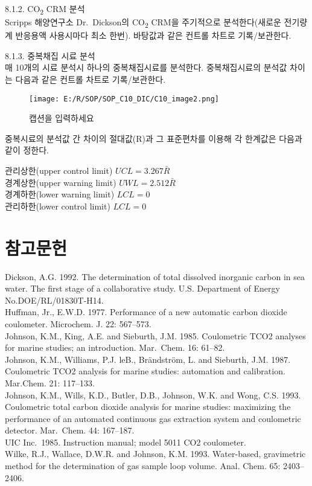 \documentclass[
]{book}
\begin{document}
8.1.2. CO\textsubscript{2} CRM 분석\\
Scripps 해양연구소 Dr.~Dickson의 CO\textsubscript{2} CRM을 주기적으로 분석한다(새로운 전기량계 반응용액 사용시마다 최소 한번). 바탕값과 같은 컨트롤 차트로 기록/보관한다.

8.1.3. 중복채집 시료 분석\\
매 10개의 시료 분석시 하나의 중복채집시료를 분석한다. 중복채집시료의 분석값 차이는 다음과 같은 컨트롤 차트로 기록/보관한다.

\begin{figure}
\centering
\texttt{[image: E:/R/SOP/SOP\_C10\_DIC/C10\_image2.png]}
\caption{캡션을 입력하세요}
\end{figure}

중복시료의 분석값 간 차이의 절대값(R)과 그 표준편차를 이용해 각 한계값은 다음과 같이 정한다.

관리상한(upper control limit) \(UCL=3.267\bar{R}\)\\
경계상한(upper warning limit) \(UWL=2.512\bar{R}\)\\
경계하한(lower warning limit) \(LCL=0\)\\
관리하한(lower control limit) \(LCL=0\)

\hypertarget{uxcc38uxace0uxbb38uxd5cc-7}{%
\section{참고문헌}\label{uxcc38uxace0uxbb38uxd5cc-7}}

Dickson, A.G. 1992. The determination of total dissolved inorganic carbon in sea water. The first stage of a collaborative study. U.S. Department of Energy No.DOE/RL/01830T-H14.\\
Huffman, Jr., E.W.D. 1977. Performance of a new automatic carbon dioxide coulometer. Microchem. J. 22: 567--573.\\
Johnson, K.M., King, A.E. and Sieburth, J.M. 1985. Coulometric TCO2 analyses for marine studies; an introduction. Mar.~Chem. 16: 61--82.\\
Johnson, K.M., Williams, P.J. leB., Brändström, L. and Sieburth, J.M. 1987. Coulometric TCO2 analysis for marine studies: automation and calibration. Mar.Chem. 21: 117--133.\\
Johnson, K.M., Wills, K.D., Butler, D.B., Johnson, W.K. and Wong, C.S. 1993. Coulometric total carbon dioxide analysis for marine studies: maximizing the performance of an automated continuous gas extraction system and coulometric detector. Mar.~Chem. 44: 167--187.\\
UIC Inc.~1985. Instruction manual; model 5011 CO2 coulometer.\\
Wilke, R.J., Wallace, D.W.R. and Johnson, K.M. 1993. Water-based, gravimetric method for the determination of gas sample loop volume. Anal. Chem. 65: 2403--2406.

  
\end{document}
